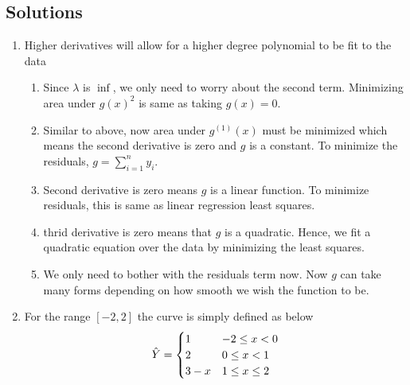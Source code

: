 \documentclass[11pt, a4paper]{article}
\begin{document}
    \subsection{Solutions}
    \begin{enumerate}
        \item \label{itm:ans1} Higher derivatives will allow for a higher degree polynomial to be fit to the data
        \begin{enumerate}
            \item Since $\lambda$ is $\inf$, we only need to worry about the second term. Minimizing area under $g(x)^{2}$ is same as taking $g(x) = 0$.
            \item Similar to above, now area under $g^{(1)}(x)$ must be minimized which means the second derivative is zero and $g$ is a constant. To minimize the residuals, $g = \sum_{i=1}^{n}y_{i}$.
            \item Second derivative is zero means $g$ is a linear function. To minimize residuals, this is same as linear regression least squares.
            \item thrid derivative is zero means that $g$ is a quadratic. Hence, we fit a quadratic equation over the data by minimizing the least squares.
            \item We only need to bother with the residuals term now. Now $g$ can take many forms depending on how smooth we wish the function to be.
        \end{enumerate}
        

        \item For the range $[-2,2]$ the curve is simply defined as below
        \begin{alignat*}{1}
            \hat{Y} = \begin{cases} 1     &\mbox{$-2 \leq x < 0$}\\
                                    2     &\mbox{$ 0 \leq x < 1$}\\
                                    3 - x &\mbox{$ 1 \leq x \leq 2$} \end{cases}
        \end{alignat*}
        


\end{enumerate}
\end{document}
